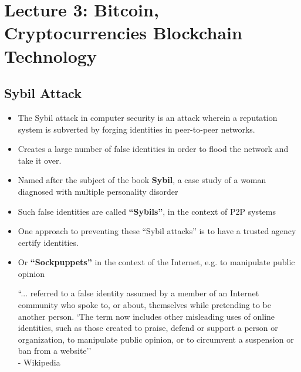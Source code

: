 \section{Lecture 3: Bitcoin, Cryptocurrencies Blockchain Technology}
\subsection{Sybil Attack}
\begin{itemize}
	\item The Sybil attack in computer security is an attack wherein a reputation system is subverted by forging identities in peer-to-peer networks.
	\item Creates a large number of false identities in order to flood the network and take it over.
	\item Named after the subject of the book \textbf{Sybil}, a case study of a woman diagnosed with multiple personality disorder
	\item Such false identities are called \textbf{``Sybils''}, in the context of P2P systems
	\item One approach to preventing these “Sybil attacks” is to have a trusted agency certify identities.
	\item Or \textbf{``Sockpuppets''} in the context of the Internet, e.g. to manipulate public opinion
	\begin{leftbar}
		``... referred to a false identity assumed by a member of an Internet community who spoke to, or about, themselves while pretending to be another person. `The term now includes other misleading uses of online identities, such as those created to praise, defend or support a person or organization, to manipulate public opinion, or to circumvent a suspension or ban from a website''\\
		- Wikipedia
	\end{leftbar}
\end{itemize}

